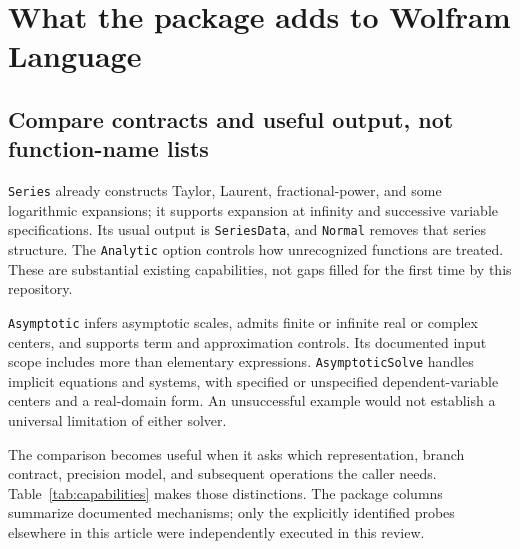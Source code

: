 \documentclass[11pt]{article}
\newcommand{\code}[1]{\texttt{#1}}
\begin{document}
\section{What the package adds to Wolfram Language}
\label{sec:comparison}
\subsection{Compare contracts and useful output, not function-name lists}
\code{Series} already constructs Taylor, Laurent, fractional-power, and some logarithmic expansions; it supports expansion at infinity and successive variable specifications. Its usual output is \code{SeriesData}, and \code{Normal} removes that series structure. The \code{Analytic} option controls how unrecognized functions are treated. These are substantial existing capabilities, not gaps filled for the first time by this repository.\cite{wlseries}

\code{Asymptotic} infers asymptotic scales, admits finite or infinite real or complex centers, and supports term and approximation controls. Its documented input scope includes more than elementary expressions. \code{AsymptoticSolve} handles implicit equations and systems, with specified or unspecified dependent-variable centers and a real-domain form. An unsuccessful example would not establish a universal limitation of either solver.\cite{wlasymptotic,wlsolve}

The comparison becomes useful when it asks which representation, branch contract, precision model, and subsequent operations the caller needs. Table~\ref{tab:capabilities} makes those distinctions. The package columns summarize documented mechanisms; only the explicitly identified probes elsewhere in this article were independently executed in this review.\cite{readme,kernelmap,contracts}
\end{document}
